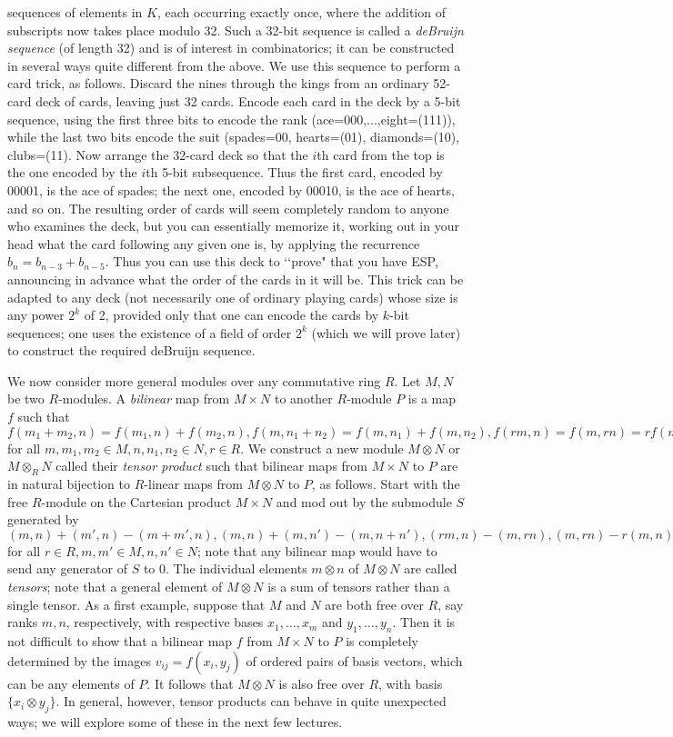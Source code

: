 \documentclass[10pt]{article}
\begin{document}
sequences of elements in $K$, each occurring exactly once, where the
addition of subscripts now takes place modulo 32. Such a 32-bit sequence
is called a {\sl deBruijn sequence} (of length 32) and is of interest in
combinatorics; it can be constructed in several ways quite different
from the above. We use this sequence to perform a card trick, as
follows. Discard the nines through the kings from an ordinary 52-card
deck of cards, leaving just 32 cards. Encode each card in the deck by a
5-bit sequence, using the first three bits to encode the rank
(ace=000,...,eight=(111)), while the last two bits encode the suit
(spades=00, hearts=(01), diamonds=(10), clubs=(11). Now arrange the
32-card deck so that the $i$th card from the top is the one encoded by
the $i$th 5-bit subsequence. Thus the first card, encoded by 00001, is
the ace of spades; the next one, encoded by 00010, is the ace of hearts,
and so on. The resulting order of cards will seem completely random to
anyone who examines the deck, but you can essentially memorize it,
working out in your head what the card following any given one is, by
applying the recurrence $b_n = b_{n-3} + b_{n-5}$. Thus you can use this
deck to \lq\lq prove" that you have ESP, announcing in advance what the
order of the cards in it will be. This trick can be adapted to any deck
(not necessarily one of ordinary playing cards) whose size is any power
$2^k$ of 2, provided only that one can encode the cards by $k$-bit
sequences; one uses the existence of a field of order $2^k$ (which we
will prove later) to construct the required deBruijn sequence.

We now consider more general modules over any commutative ring $R$. Let
$M,N$ be two $R$-modules. A {\sl bilinear} map from $M\times N$ to
another $R$-module $P$ is a map $f$ such that $f(m_1+m_2,n) =
f(m_1,n)+f(m_2,n), f(m,n_1+n_2) = f(m,n_1)+f(m,n_2), f(rm,n) = f(m,rn) =
rf(m,n)$ for all $m,m_1,m_2\in M, n,n_1,n_2\in N, r\in R$. We construct
a new module $M\otimes N$ or $M\otimes_R N$ called their {\sl tensor
  product} such that bilinear maps from $M\times N$ to $P$ are in
natural bijection to $R$-linear maps from $M\otimes N$ to $P$, as
follows. Start with the free $R$-module on the Cartesian product
$M\times N$ and mod out by the submodule $S$ generated by $(m,n) +
(m',n) - (m+m',n), (m,n) + (m,n') - (m,n+n'), (rm,n) - (m,rn),(m,rn) -
r(m,n)$ for all $r\in R,m,m'\in M, n,n'\in N$; note that any bilinear
map would have to send any generator of $S$ to 0. The individual
elements $m\otimes n$ of $M\otimes N$ are called {\sl tensors}; note
that a general element of $M\otimes N$ is a sum of tensors rather than a
single tensor. As a first example, suppose that $M$ and $N$ are both
free over $R$, say ranks $m,n$, respectively, with respective bases
$x_1,\ldots,x_m$ and $y_1,\ldots,y_n$. Then it is not difficult to show
that a bilinear map $f$ from $M\times N$ to $P$ is completely determined
by the images $v_{ij}=f(x_i,y_j)$ of ordered pairs of basis vectors,
which can be any elements of $P$. It follows that $M\otimes N$ is also
free over $R$, with basis $\{x_ i\otimes y_j\}$. In general, however,
tensor products can behave in quite unexpected ways; we will explore
some of these in the next few lectures.
\end{document}
